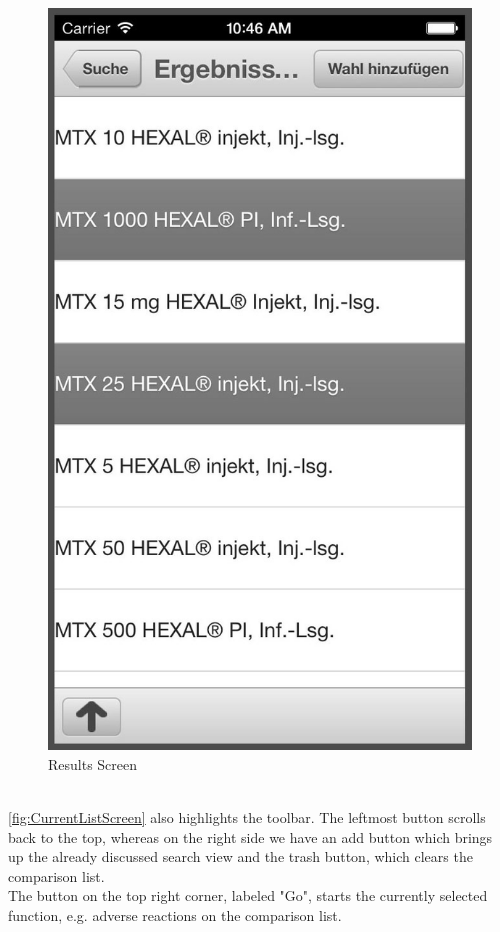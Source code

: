 \begin{figure}[!b]
\begin{minipage}[b]{0.45\linewidth}
        \includegraphics[width=0.8025\linewidth]{figures/Results_Alt_bw.jpg}
        \caption[List Screen to add to Comparison List]{Results Screen}
        \label{fig:AlternativeListScreen}
    \end{minipage}
\end{figure}
\\
\ref{fig:CurrentListScreen} also highlights the toolbar. The leftmost button scrolls back to the top, whereas on the right side we have an add button which brings up the already discussed search view and the trash button, which clears the comparison list. 
\\
The button on the top right corner, labeled "Go", starts the currently selected function, e.g. adverse reactions on the comparison list.
\\
